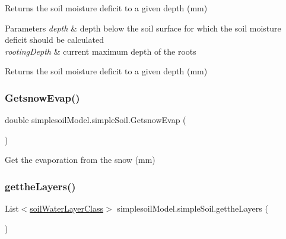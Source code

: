 Returns the soil moisture deficit to a given depth (mm) 


\begin{DoxyParams}{Parameters}
{\em depth} & depth below the soil surface for which the soil moisture deficit should be calculated \\
\hline
{\em rooting\+Depth} & current maximum depth of the roots \\
\hline
\end{DoxyParams}
\begin{DoxyReturn}{Returns}
the soil moisture deficit to a given depth (mm) 
\end{DoxyReturn}
\mbox{\label{classsimplesoil_model_1_1simple_soil_a3745efc62197a3432e8dc6065e008a6e}} 
\subsubsection{\texorpdfstring{GetsnowEvap()}{GetsnowEvap()}}
{\footnotesize\ttfamily double simplesoil\+Model.\+simple\+Soil.\+Getsnow\+Evap (\begin{DoxyParamCaption}{ }\end{DoxyParamCaption})\hspace{0.3cm}{\ttfamily [inline]}}



Get the evaporation from the snow (mm) 

\mbox{\label{classsimplesoil_model_1_1simple_soil_a2bdef505d32a606cc6937983a77abed2}} 
\subsubsection{\texorpdfstring{gettheLayers()}{gettheLayers()}}
{\footnotesize\ttfamily List$<$\mbox{\hyperlink{classsimplesoil_model_1_1soil_water_layer_class}{soil\+Water\+Layer\+Class}}$>$ simplesoil\+Model.\+simple\+Soil.\+getthe\+Layers (\begin{DoxyParamCaption}{ }\end{DoxyParamCaption})\hspace{0.3cm}{\ttfamily [inline]}}



